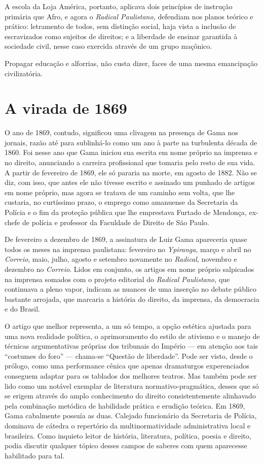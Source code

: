 A escola da Loja América, portanto, aplicava dois princípios de
instrução primária que Afro, e agora o \emph{Radical Paulistano,}
defendiam nos planos teórico e prático: letramento de todos, sem
distinção social, haja vista a inclusão de escravizados como sujeitos de
direitos; e a liberdade de ensinar garantida à sociedade civil, nesse
caso exercida através de um grupo maçônico.

Propagar educação e alforrias, não custa dizer, faces de uma mesma
emancipação civilizatória.

\section{A virada de 1869}

O ano de 1869, contudo, significou uma clivagem na presença de Gama nos
jornais, razão até para sublinhá-lo como um ano à parte na turbulenta
década de 1860. Foi nesse ano que Gama iniciou sua escrita em nome
próprio na imprensa e no direito, anunciando a carreira profissional que
tomaria pelo resto de sua vida. A partir de fevereiro de 1869, ele só
pararia na morte, em agosto de 1882. Não se diz, com isso, que antes ele
não tivesse escrito e assinado um punhado de artigos em nome próprio,
mas agora se tratava de um caminho sem volta, que lhe custaria, no
curtíssimo prazo, o emprego como amanuense da Secretaria da Polícia e o
fim da proteção pública que lhe emprestava Furtado de Mendonça, ex-chefe
de polícia e professor da Faculdade de Direito de São Paulo.

De fevereiro a dezembro de 1869, a assinatura de Luiz Gama apareceria
quase todos os meses na imprensa paulistana: fevereiro no \emph{Ypiranga}, 
março e abril no \emph{Correio}, maio, julho, agosto e
setembro novamente no \emph{Radical}, novembro e dezembro no
\emph{Correio}. Lidos em conjunto, os artigos em nome próprio salpicados
na imprensa somados com o projeto editorial do \emph{Radical
Paulistano,} que continuava a pleno vapor, indicam as nuances de uma
inserção no debate público bastante arrojada, que marcaria a história do
direito, da imprensa, da democracia e do Brasil.

O artigo que melhor representa, a um só tempo, a opção estética ajustada
para uma nova realidade política, o aprimoramento do estilo de ativismo
e o manejo de técnicas argumentativas próprias dos tribunais do Império
--- em atenção aos tais ``costumes do foro'' --- chama-se ``Questão de
liberdade''. Pode ser visto, desde o prólogo, como uma performance cênica
que apenas dramaturgos experenciados conseguem adaptar para os tablados
dos melhores teatros. Mas também pode ser lido como um notável exemplar
de literatura normativo-pragmática, desses que só se erigem através do
amplo conhecimento do direito consistentemente alinhavado pela
combinação metódica de habilidade prática e erudição teórica. Em 1869,
Gama cabalmente possuía as duas. Calejado funcionário da Secretaria de
Polícia, dominava de cátedra o repertório da multinormatividade
administrativa local e brasileira. Como inquieto leitor de história,
literatura, política, poesia e direito, podia discutir qualquer tópico
desses campos de saberes com quem aparecesse habilitado para tal.


